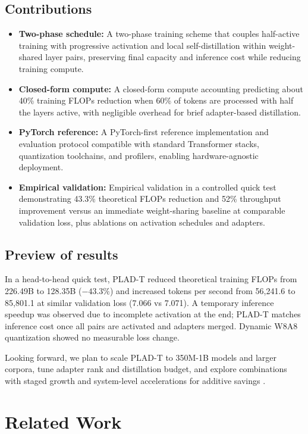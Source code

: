 \documentclass{article}
\begin{document}
\subsection{Contributions}
\begin{itemize}
  \item \textbf{Two-phase schedule:} A two-phase training scheme that couples half-active training with progressive activation and local self-distillation within weight-shared layer pairs, preserving final capacity and inference cost while reducing training compute.
  \item \textbf{Closed-form compute:} A closed-form compute accounting predicting about 40\% training FLOPs reduction when 60\% of tokens are processed with half the layers active, with negligible overhead for brief adapter-based distillation.
  \item \textbf{PyTorch reference:} A PyTorch-first reference implementation and evaluation protocol compatible with standard Transformer stacks, quantization toolchains, and profilers, enabling hardware-agnostic deployment.
  \item \textbf{Empirical validation:} Empirical validation in a controlled quick test demonstrating 43.3\% theoretical FLOPs reduction and 52\% throughput improvement versus an immediate weight-sharing baseline at comparable validation loss, plus ablations on activation schedules and adapters.
\end{itemize}

\subsection{Preview of results}
In a head-to-head quick test, PLAD-T reduced theoretical training FLOPs from 226.49B to 128.35B (\(-43.3\%\)) and increased tokens per second from 56,241.6 to 85,801.1 at similar validation loss (7.066 vs 7.071). A temporary inference speedup was observed due to incomplete activation at the end; PLAD-T matches inference cost once all pairs are activated and adapters merged. Dynamic W8A8 quantization showed no measurable loss change.

Looking forward, we plan to scale PLAD-T to 350M-1B models and larger corpora, tune adapter rank and distillation budget, and explore combinations with staged growth and system-level accelerations for additive savings \cite{shen-2022-staged,andoorveedu-2022-tempo,narayanan-2020-memory}.

\section{Related Work}
\end{document}
